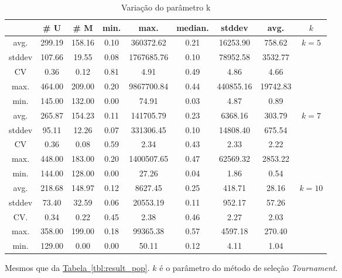 \documentclass[a4paper]{paper}
\begin{document}
\begin{table}
  \center
  \caption{Variação do parâmetro k}
  \label{tbl:var_k}
  \begin{tabular}{| c | c | c | c | c | c | c | c | c |}
    \hline
    &  \# U & \# M & min. & max. & median. & stddev & avg. & $k$ \\ \hline \hline
avg. & 299.19 & 158.16 & 0.10 & 360372.62 & 0.21 & 16253.90 & 758.62 & \multirow{5}{1.5cm}{$k=5$} \\ \cline{1-8}
stddev & 107.66 & 19.55 & 0.08 & 1767685.76 & 0.10 & 78952.58 & 3532.77 & \\ \cline{1-8}
CV & 0.36 & 0.12 & 0.81 & 4.91 & 0.49 & 4.86 & 4.66 & \\ \cline{1-8}
max. & 464.00 & 209.00 & 0.20 & 9867700.84 & 0.44 & 440855.16 & 19742.83 & \\ \cline{1-8}
min. & 145.00 & 132.00 & 0.00 & 74.91 & 0.03 & 4.87 & 0.89 & \\ \hline \hline
avg. & 265.87 & 154.23 & 0.11 & 141705.79 & 0.23 & 6368.16 & 303.79 & \multirow{5}{1.5cm}{$k=7$} \\ \cline{1-8}
stddev & 95.11 & 12.26 & 0.07 & 331306.45 & 0.10 & 14808.40 & 675.54 & \\ \cline{1-8}
CV & 0.36 & 0.08 & 0.59 & 2.34 & 0.43 & 2.33 & 2.22 & \\ \cline{1-8}
max. & 448.00 & 183.00 & 0.20 & 1400507.65 & 0.47 & 62569.32 & 2853.22 & \\ \cline{1-8}
min. & 144.00 & 128.00 & 0.00 & 27.26 & 0.04 & 1.86 & 0.54 & \\ \hline \hline
avg. & 218.68 & 148.97 & 0.12 & 8627.45 & 0.25 & 418.71 & 28.16 & \multirow{5}{1.5cm}{$k=10$}\\ \cline{1-8}
stddev & 73.40 & 32.59 & 0.06 & 20553.19 & 0.11 & 952.17 & 57.26 & \\ \cline{1-8}
CV. & 0.34 & 0.22 & 0.45 & 2.38 & 0.46 & 2.27 & 2.03 & \\ \cline{1-8}
max. & 358.00 & 199.00 & 0.18 & 99365.38 & 0.57 & 4597.18 & 270.40 & \\ \cline{1-8}
min. & 129.00 & 0.00 & 0.00 & 50.11 & 0.12 & 4.11 & 1.04 & \\ \hline 
  \end{tabular}
  \begin{minipage}{0.9\textwidth}
    {\footnotesize
      Mesmos que da \hyperref[tbl:result_pop]{Tabela~\ref*{tbl:result_pop}}.
      $k$ é o parâmetro do método de seleção \textit{Tournament}.
    }
  \end{minipage}
  
\end{table}
\end{document}
